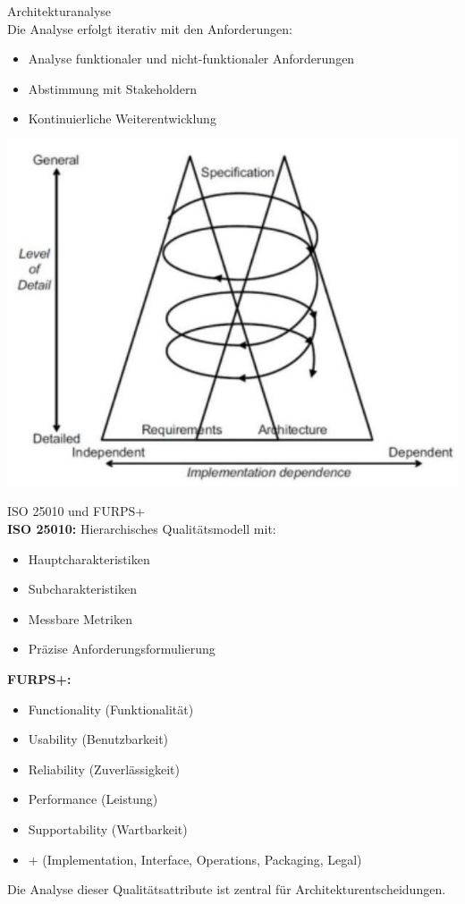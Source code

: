 \begin{theorem}{Architekturanalyse}\\
Die Analyse erfolgt iterativ mit den Anforderungen:
\begin{itemize}
    \item Analyse funktionaler und nicht-funktionaler Anforderungen
    \item Abstimmung mit Stakeholdern
    \item Kontinuierliche Weiterentwicklung
\end{itemize}
\includegraphics[width=0.9\linewidth]{images/2024_12_29_0d1d7b5551ea1b4b41bdg-08}
\end{theorem}

\begin{corollary}{ISO 25010 und FURPS+}\\
\textbf{ISO 25010:}
Hierarchisches Qualitätsmodell mit:
\begin{itemize}
    \item Hauptcharakteristiken
    \item Subcharakteristiken
    \item Messbare Metriken
    \item Präzise Anforderungsformulierung
\end{itemize}

\textbf{FURPS+:}
\begin{itemize}
    \item Functionality (Funktionalität)
    \item Usability (Benutzbarkeit)
    \item Reliability (Zuverlässigkeit)
    \item Performance (Leistung)
    \item Supportability (Wartbarkeit)
    \item + (Implementation, Interface, Operations, Packaging, Legal)
\end{itemize}

Die Analyse dieser Qualitätsattribute ist zentral für Architekturentscheidungen.
\end{corollary}


